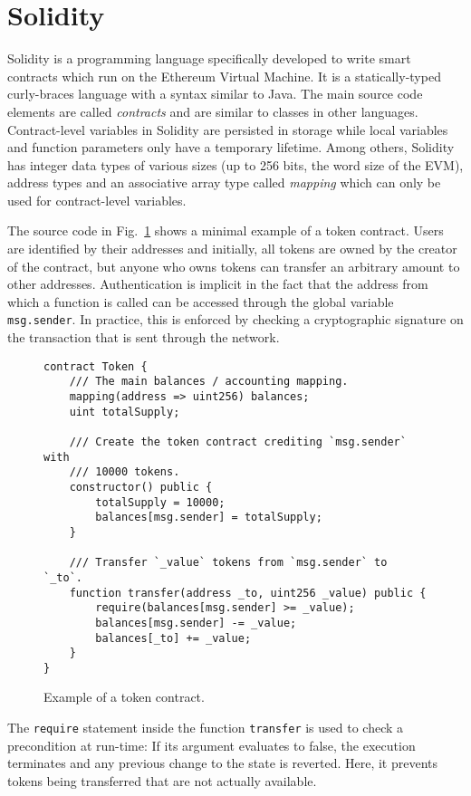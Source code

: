 \section{Solidity}
\label{section:solidity}

Solidity is a programming language specifically developed to write smart contracts
which run on the Ethereum Virtual Machine. It is a statically-typed curly-braces
language with a syntax similar to Java. The main source code elements are
called \emph{contracts} and are similar to classes in other languages.
Contract-level variables in Solidity are persisted in storage while
local variables and function parameters only have a temporary lifetime.
Among others, Solidity has integer data types of various sizes (up to 256 bits,
the word size of the EVM), address types and an associative array
type called \emph{mapping} which can only be used for contract-level variables.

The source code in Fig.~\ref{fig:tokenContract} shows a minimal example of a token contract.
Users are identified by their addresses and initially, all tokens are
owned by the creator of the contract, but
anyone who owns tokens can transfer an arbitrary amount to other addresses.
Authentication is implicit in the fact that the address from which
a function is called can be accessed through the global variable
\texttt{msg.sender}. In practice, this is enforced by checking a
cryptographic signature on the transaction that is sent through the network.

\begin{figure}
\begin{verbatim}
contract Token {
    /// The main balances / accounting mapping.
    mapping(address => uint256) balances;
    uint totalSupply;

    /// Create the token contract crediting `msg.sender` with
    /// 10000 tokens.
    constructor() public {
        totalSupply = 10000;
        balances[msg.sender] = totalSupply;
    }

    /// Transfer `_value` tokens from `msg.sender` to `_to`.
    function transfer(address _to, uint256 _value) public {
        require(balances[msg.sender] >= _value);
        balances[msg.sender] -= _value;
        balances[_to] += _value;
    }
}
\end{verbatim}
\caption{Example of a token contract.}
\label{fig:tokenContract}
\end{figure}

The \texttt{require} statement inside the function \texttt{transfer} is used
to check a precondition at run-time: If its argument evaluates to false,
the execution terminates and any previous change to the state is reverted.
Here, it prevents tokens being transferred that are not actually available.

